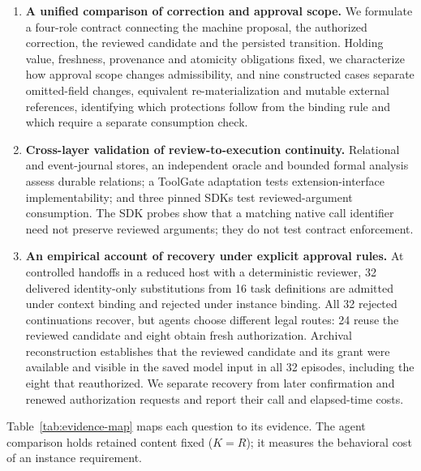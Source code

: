 \documentclass[pdflatex,sn-basic]{sn-jnl}
\begin{document}
\begin{enumerate}
\item \textbf{A unified comparison of correction and approval scope.} We formulate a four-role contract connecting the machine proposal, the authorized correction, the reviewed candidate and the persisted transition. Holding value, freshness, provenance and atomicity obligations fixed, we characterize how approval scope changes admissibility, and nine constructed cases separate omitted-field changes, equivalent re-materialization and mutable external references, identifying which protections follow from the binding rule and which require a separate consumption check.
\item \textbf{Cross-layer validation of review-to-execution continuity.} Relational and event-journal stores, an independent oracle and bounded formal analysis assess durable relations; a ToolGate adaptation tests extension-interface implementability; and three pinned SDKs test reviewed-argument consumption. The SDK probes show that a matching native call identifier need not preserve reviewed arguments; they do not test contract enforcement.
\item \textbf{An empirical account of recovery under explicit approval rules.} At controlled handoffs in a reduced host with a deterministic reviewer, 32 delivered identity-only substitutions from 16 task definitions are admitted under context binding and rejected under instance binding. All 32 rejected continuations recover, but agents choose different legal routes: 24 reuse the reviewed candidate and eight obtain fresh authorization. Archival reconstruction establishes that the reviewed candidate and its grant were available and visible in the saved model input in all 32 episodes, including the eight that reauthorized. We separate recovery from later confirmation and renewed authorization requests and report their call and elapsed-time costs.
\end{enumerate}

Table~\ref{tab:evidence-map} maps each question to its evidence. The agent comparison holds retained content fixed ($K=R$); it measures the behavioral cost of an instance requirement.
\end{document}

